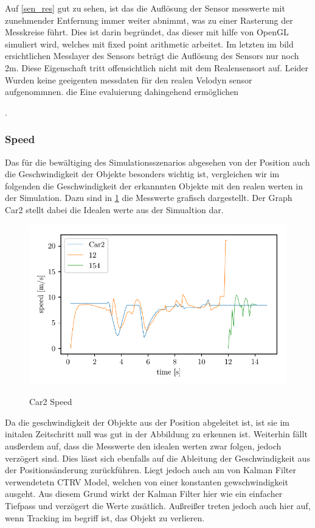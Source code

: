\documentclass[11pt,oneside,openright]{mpreport}
\begin{document}
Auf \cref{sen_res} gut zu sehen, ist das die Auflösung der Sensor messwerte mit zunehmender Entfernung immer weiter abnimmt, was zu einer Rasterung der Messkreise führt. Dies ist darin begründet,
das dieser mit hilfe von OpenGL simuliert wird, welches mit fixed point arithmetic arbeitet. Im letzten im bild ersichtlichen Messlayer des Sensors beträgt die 
Auflösung des Sensors nur noch 2m. Diese Eigenschaft tritt offensichtlich nicht mit dem Realensensort auf. Leider Wurden keine geeigenten messdaten für den realen Velodyn sensor aufgenommnen.
die Eine evaluierung dahingehend ermöglichen

.
\subsubsection{Speed}

Das für die bewältiging des Simulationsszenarios abgesehen von der Position auch die Geschwindigkeit der Objekte besonders wichtig ist, vergleichen wir im
folgenden die Geschwindigkeit der erkannnten Objekte mit den realen werten in der Simulation. Dazu sind in \cref{car2_speed} die Messwerte
grafisch dargestellt. Der Graph Car2 stellt dabei die Idealen werte aus der Simualtion dar.


\begin{figure}[!htb]
  \caption{Car2 Speed} 
  \centering
  \includegraphics[width=\textwidth]{bilder/Car2_speed.pdf}
 \label{car2_speed}
\end{figure}

Da die geschwindigkeit der Objekte aus der Position abgeleitet ist, ist sie im initalen Zeitschritt null was gut in der Abbildung zu erkennen ist.
Weiterhin fällt ausßerdem auf, dass die Messwerte den idealen werten zwar folgen, jedoch verzögert sind. Dies lässt sich ebenfalls auf die Ableitung der Geschwindigkeit
aus der Positionsänderung zurückführen.  Liegt jedoch auch am von Kalman Filter verwendetetn \ac{CTRV} Model, welchen von einer konstanten gewschwindigkeit ausgeht.
Aus diesem Grund wirkt der Kalman Filter hier wie ein einfacher Tiefpass und verzögert die Werte zusätlich. Außreißer treten jedoch auch hier auf, wenn Tracking im begriff ist, das Objekt zu verlieren.
\end{document}
